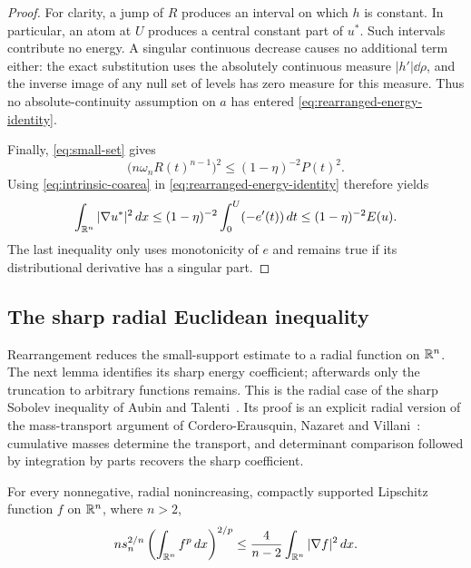 \begin{proof}
For clarity, a jump of $R$ produces an interval on which $h$ is
constant.  In particular, an atom at $U$ produces a central constant
part of $u^*$.  Such intervals contribute no energy.  A singular
continuous decrease causes no additional term either: the exact
substitution uses the absolutely continuous measure
$|h'|\dd\rho$, and the inverse image of any null set of levels has
zero measure for this measure.  Thus no absolute-continuity
assumption on $a$ has entered
\eqref{eq:rearranged-energy-identity}.

Finally, \eqref{eq:small-set} gives
\[
 \bigl(n\omega_n R(t)^{n-1}\bigr)^2
       \le(1-\eta)^{-2}P(t)^2.
\]
Using \eqref{eq:intrinsic-coarea} in
\eqref{eq:rearranged-energy-identity} therefore yields
\[
 \int_{\mathbb R^n}|\nabla u^*|^2\,d x
   \le(1-\eta)^{-2}\int_0^U(-e'(t))\,d t
   \le(1-\eta)^{-2}E(u).
\]
The last inequality only uses monotonicity of $e$ and remains true
if its distributional derivative has a singular part.
\end{proof}

\subsection{The sharp radial Euclidean inequality}

Rearrangement reduces the small-support estimate to a radial function
on $\mathbb R^n$. The next lemma identifies its sharp energy coefficient;
afterwards only the truncation to arbitrary functions remains.
This is the radial case of the sharp Sobolev inequality of Aubin and
Talenti~\cite{Aubin1976,Talenti1976}. Its proof is an explicit radial
version of the mass-transport argument of Cordero-Erausquin, Nazaret and
Villani~\cite[Section~2]{CorderoNazaretVillani2004}: cumulative masses
determine the transport, and determinant comparison followed by
integration by parts recovers the sharp coefficient.

\begin{lemma}
\label{lem:radial-sobolev}
For every nonnegative, radial nonincreasing, compactly supported
Lipschitz function $f$ on $\mathbb R^n$, where $n>2$,
\begin{equation}
 ns_n^{2/n}
       \left(\int_{\mathbb R^n}f^p\,d x\right)^{2/p}
    \le \frac4{n-2}\int_{\mathbb R^n}|\nabla f|^2\,d x.
 \label{eq:radial-sobolev}
\end{equation}
\end{lemma}

